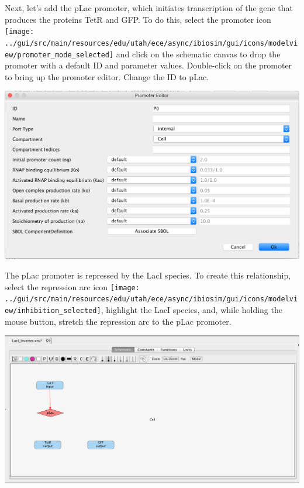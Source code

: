 \documentclass[titlepage,11pt]{article}
\begin{document}
Next, let's add the pLac promoter, which initiates transcription of the gene that produces the proteins TetR and GFP.  To do this, select the promoter icon \texttt{[image: ../gui/src/main/resources/edu/utah/ece/async/ibiosim/gui/icons/modelview/promoter\_mode\_selected]} and click on the schematic canvas to drop the promoter with a default ID and parameter values.  Double-click on the promoter to bring up the promoter editor.  Change the ID to pLac.
 
\begin{center}
\includegraphics[width=160mm]{screenshots/promoterGT} 
\end{center}

The pLac promoter is repressed by the LacI species.  To create this relationship, select the repression arc icon 
\texttt{[image: ../gui/src/main/resources/edu/utah/ece/async/ibiosim/gui/icons/modelview/inhibition\_selected]}, highlight the LacI species, and, while holding the mouse button, stretch the repression arc to the pLac promoter.  

\begin{center}
\includegraphics[width=160mm]{screenshots/repressionGT} 
\end{center}
\end{document}
